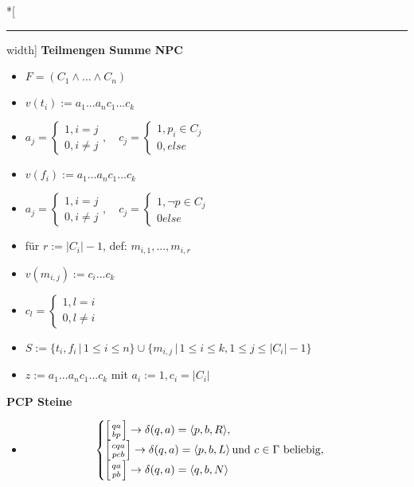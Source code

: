 \documentclass[12pt,a4paper]{article}
\begin{document}
\begin{paracol}{3}
\begin{itemize}
\end{itemize}
\switchcolumn[0]*[\hrule width\textwidth]
\centering
\textbf{Teilmengen Summe NPC}
\flushleft
\begin{itemize}
\setlength\itemsep{-0.5em}
\item $F = (C_1 \land ... \land C_n)$
\item $v(t_i) := a_1...a_nc_1...c_k$
\item $\displaystyle a_j = \begin{cases}1, i=j\\0,  i\neq j\end{cases},\quad c_j = \begin{cases}1, p_i \in C_j\\0, else\end{cases}$
\item $v(f_i):=a_1...a_nc_1...c_k$
\item $\displaystyle a_j = \begin{cases}1, i=j\\0, i\neq j \end{cases},\quad c_j = \begin{cases}1, \neg p \in C_j\\0 else \end{cases}$
\item für $r := |C_i| -1$, def: $m_{i, 1},...,m_{i,r}$
\item $v(m_{i,j}) := c_i...c_k$
\item $\displaystyle c_l = \begin{cases}1, l=i\\0, l\neq i \end{cases}$
\item $\displaystyle S := \big\{t_i,f_i \, \big\vert \, 1 \leq i \leq n \big\} \cup \big\{ m_{i,j} \, \big\vert\, 1\leq i\leq k, 1\leq j \leq |C_i|-1\big\}$
\item $z := a_1...a_nc_1...c_k$ mit $a_i := 1, c_i = |C_i|$
\end{itemize}
\switchcolumn[1]
\centering
\textbf{PCP Steine}
\flushleft
\begin{itemize}
\setlength\itemsep{-0.5em}
\item $$
\begin{cases}
\left[ {qa \atop bp} \right] \rightarrow \delta(q,a) = \langle p,b,R \rangle,\\
\left[ {cqa \atop pcb} \right] \rightarrow \delta(q,a) = \langle p,b,L \rangle \, \text{und $c \in \Gamma$ beliebig},\\
\left[ {qa \atop pb} \right] \rightarrow \delta(q,a) = \langle q,b,N \rangle\\

\end{cases}$$
\end{itemize}
\end{paracol}
\end{document}

